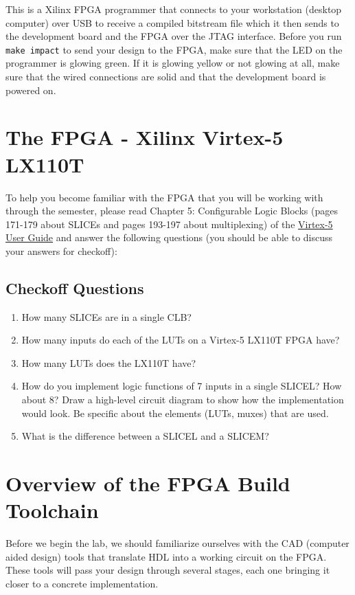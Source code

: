 \documentclass[11pt]{article}
\begin{document}
This is a Xilinx FPGA programmer that connects to your workstation (desktop computer) over USB to receive a compiled bitstream file which it then sends to the development board and the FPGA over the JTAG interface. Before you run \verb|make impact| to send your design to the FPGA, make sure that the LED on the programmer is glowing green. If it is glowing yellow or not glowing at all, make sure that the wired connections are solid and that the development board is powered on.

\section{The FPGA - Xilinx Virtex-5 LX110T}
To help you become familiar with the FPGA that you will be working with through the semester, please read Chapter 5: Configurable Logic Blocks (pages 171-179 about SLICEs and pages 193-197 about multiplexing) of the \href{http://inst.eecs.berkeley.edu/~cs150/fa11/resources/ug190.pdf}{Virtex-5 User Guide} and answer the following questions (you should be able to discuss your answers for checkoff):

\subsection{Checkoff Questions}
\begin{enumerate}
	\item How many SLICEs are in a single CLB?
	\item How many inputs do each of the LUTs on a Virtex-5 LX110T FPGA have?
	\item How many LUTs does the LX110T have?
	\item How do you implement logic functions of 7 inputs in a single SLICEL? How about 8? Draw a high-level circuit diagram to show how the implementation would look. Be specific about the elements (LUTs, muxes) that are used.
	\item What is the difference between a SLICEL and a SLICEM?
\end{enumerate}

\section{Overview of the FPGA Build Toolchain}
Before we begin the lab, we should familiarize ourselves with the CAD (computer aided design) tools that translate HDL into a working circuit on the FPGA. These tools will pass your design through several stages, each one bringing it closer to a concrete implementation.
\end{document}
